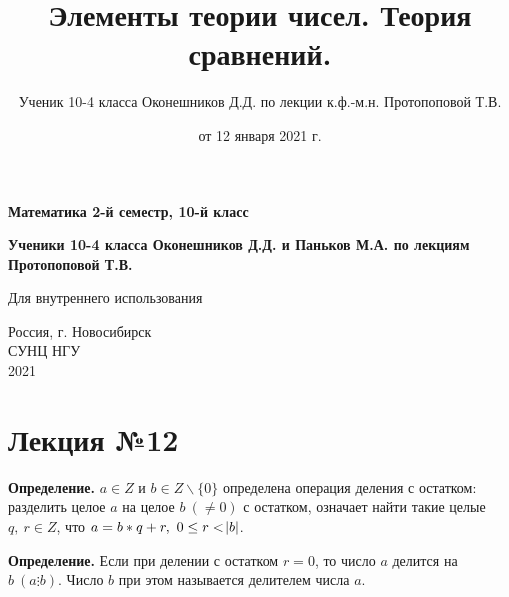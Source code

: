\documentclass{article}
\begin{document}
  \begin{titlepage}
    \begin{center}
        \vspace*{1cm}
            
        \Huge
        \textbf{Математика 2-й семестр, 10-й класс}
            
        \vspace{5cm}
          
        \Large
        \textbf{Ученики 10-4 класса Оконешников Д.Д. и Паньков М.А. по лекциям Протопоповой Т.В.}
            
        \vfill

        Для внутреннего использования

        \vspace{0.8cm}
        
        \Large
        Россия, г. Новосибирск\\
        СУНЦ НГУ\\
        2021\\
        
            
    \end{center}
  \end{titlepage}
	\newpage
	\tableofcontents
	\thispagestyle{empty}
	\setcounter{tocdepth}{5}
	\newpage

  \title{Элементы теории чисел. Теория сравнений.}
  \author{Ученик 10-4 класса Оконешников Д.Д. по лекции к.ф.-м.н. Протопоповой Т.В.}
  \date{от 12 января 2021 г.}
  \maketitle

  \section{Лекция №12}
  
  \textbf{Определение.} \( a \in Z \) и \( b \in Z \backslash \{0\} \) определена операция деления с остатком: разделить целое \( a \) на целое \(b\ (\neq 0) \) с остатком, 
  означает найти такие целые \( q,\ r \in Z \), что \(a=b*q+r,\ 0 \leq r < \abs{b} \).

  \textbf{Определение.} Если при делении с остатком \( r = 0 \), то число \( a \) делится на \( b\ (a \vdots b) \). Число \( b \) при этом называется делителем числа \( a \).
\end{document}
